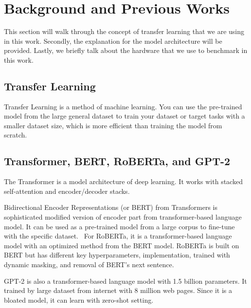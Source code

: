 \section{Background and Previous Works}

This section will walk through the concept of transfer learning that we are using in this work. Secondly, the explanation for the model architecture will be provided. Lastly, we briefly talk about the hardware that we use to benchmark in this work.

\subsection{Transfer Learning}

Transfer Learning is a method of machine learning. You can use the pre-trained model from the large general dataset to train your dataset or target tasks with a smaller dataset size, which is more efficient than training the model from scratch.~\cite{brownlee2017gentle}

\subsection{Transformer, BERT, RoBERTa, and GPT-2}

The Transformer is a model architecture of deep learning. It works with stacked self-attention and encoder/decoder stacks.~\cite{vaswani2017attention}

Bidirectional Encoder Representations (or BERT) from Transformers is sophisticated modified version of encoder part from transformer-based language model. It can be used as a pre-trained model from a large corpus to fine-tune with the specific dataset.~\cite{devlin2018bert} For RoBERTa, it is a transformer-based language model with an optimized method from the BERT model. RoBERTa is built on BERT but has different key hyperparameters, implementation, trained with dynamic masking, and removal of BERT's next sentence.~\cite{liu2019roberta}

GPT-2 is also a transformer-based language model with 1.5 billion parameters. It trained by large dataset from internet with 8 million web pages. Since it is a bloated model, it can learn with zero-shot setting.~\cite{radford2019better}

